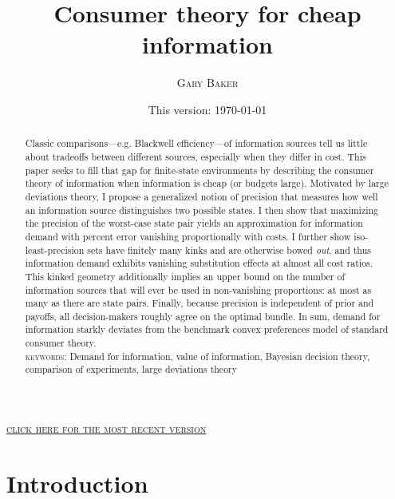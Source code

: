 \documentclass{fancyArticle}
\title{\large Consumer theory for cheap information}
\author{\textsc{Gary Baker}}
\date{This version: \today}
\renewcommand{\|}{\,|\,}                    %
\providecommand{\;}{\,;}                    %
\begin{document}
\maketitle
\begin{center}
  \href{https://www.garygbaker.com/info-consumer-theory.pdf}{\color{blue}
    \underline{\textsc{click here for the most recent version}}}
\end{center}

\begin{abstract}
  Classic comparisons---e.g. Blackwell efficiency---of information sources tell us little about tradeoffs between different sources, especially when they differ in cost.
  This paper seeks to fill that gap for finite-state environments by describing the consumer theory of information when information is cheap (or budgets large).
  Motivated by large deviations theory, I propose a generalized notion of precision that measures how well an information source distinguishes two possible states.
  I then show that maximizing the precision of the worst-case state pair yields an approximation for information demand with percent error vanishing proportionally with costs.
  I further show iso-least-precision sets have finitely many kinks and are otherwise bowed \textit{out},
  and thus information demand exhibits vanishing substitution effects at almost all cost ratios.
  This kinked geometry additionally implies an upper bound on the number of information sources that will ever be used in non-vanishing proportions: at most as many as there are state pairs.
  Finally, because precision is independent of prior and payoffs, all decision-makers roughly agree on the optimal bundle.
  In sum, demand for information starkly deviates from the benchmark convex preferences model of standard consumer theory.\\

  \textsc{keywords:} Demand for information, value of information, Bayesian decision theory, comparison of experiments, large deviations theory
\end{abstract}



\section{Introduction}
\label{sec:introduction}
\end{document}
